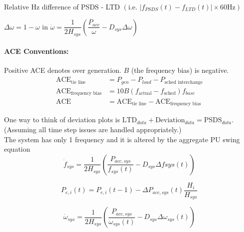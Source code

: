 \documentclass[12pt]{article}
\begin{document}
	Relative Hz difference of PSDS - LTD $\left( \text{i.e. }  \left|f_{PSDS}(t)- f_{LTD}(t)\right| \times 60 \text{Hz} \right)$
	
	$\Delta \omega=1-\omega$ in $\dot{\omega}=\dfrac{1}{2H_{sys}}\left(\dfrac{P_{acc}}{\omega} - D_{sys}\Delta \omega \right)$
	
	\paragraph{ACE Conventions:} Positive ACE denotes over generation. $B$ (the frequency bias) is negative.
	\begin{align*}
	\text{ACE}_{\text{tie line}} &= P_{gen} - P_{load} - P_{\text{sched interchange}}\\
	\text{ACE}_{\text{frequency bias}} &= 10B(f_{\text{actual}}-f_{\text{sched}})f_{base}\\
	\text{ACE} &= \text{ACE}_{\text{tie line}} -\text{ACE}_{\text{frequency bias}}
	\end{align*}
	
	One way to think of deviation plots is $\text{LTD}_{data}+\text{Deviation}_{data} = \text{PSDS}_{data}$. \\(Assuming all time step issues are handled appropriately.)\\
	
	The system has only 1 frequency and it is altered by the aggregate PU swing equation
	\[ \dot{f}_{sys} = \dfrac{1}{2H_{sys} } \left( \dfrac{P_{acc, sys} }{f_{sys}(t)} - D_{sys}\Delta f{sys}(t)  \right)  \]
	
	\[ P_{e,i}(t) = P_{e,i}(t-1)-\Delta P_{acc,sys}(t)\dfrac{H_{i}}{H_{sys}} \]
	
	\[ \dot{\omega}_{sys} = \dfrac{1}{2H_{sys} } \left( \dfrac{P_{acc, sys} }{\omega_{sys}(t)} - D_{sys}\Delta\omega_{sys}(t)  \right)\] 
	
\end{document}
